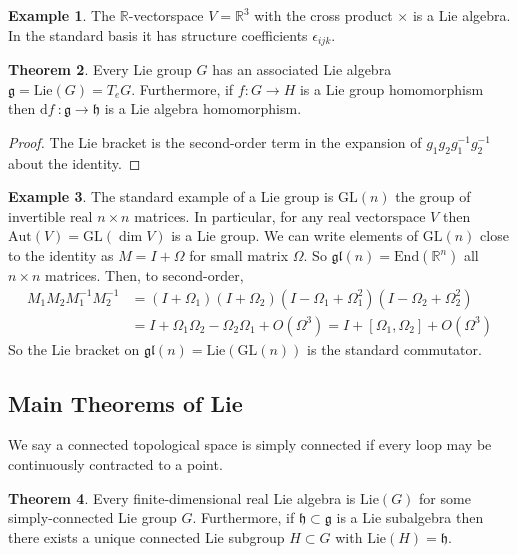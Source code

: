 \documentclass[12pt]{extarticle}
\newcommand{\R}{\mathbb{R}}
\newcommand{\End}[1]{\mathrm{End}\left(#1\right)}
\renewcommand{\d}[1]{ \mathrm{d}#1 \:}
\theoremstyle{definition}
\newtheorem{theorem}{Theorem}[section]
\newtheorem{example}[theorem]{Example}
\newenvironment{definition}[1][Definition:]{\begin{trivlist}
\item[\hskip \labelsep {\bfseries #1}]}{\end{trivlist}}
\newcommand{\GL}[1]{\mathrm{GL}\left(#1\right)}
\newcommand{\g}{\mathfrak{g}}
\newcommand{\h}{\mathfrak{h}}
\newcommand{\gl}[1]{\mathfrak{gl}\left(#1\right)}
\newcommand{\Lie}[1]{\mathrm{Lie}\left(#1 \right)}
\newcommand{\Aut}[1]{\mathrm{Aut}\left(#1 \right)}
\begin{document}
\begin{example}
The $\R$-vectorspace $V = \R^3$ with the cross product $\times$ is a Lie algebra. In the standard basis it has structure coefficients $\epsilon_{ijk}$. 
\end{example}


\begin{theorem}
Every Lie group $G$ has an associated Lie algebra $\g = \Lie{G} = T_e G$. Furthermore, if $f : G \to H$ is a Lie group homomorphism then $\d{f} : \g \to \h$ is a Lie algebra homomorphism.
\end{theorem}

\begin{proof}
The Lie bracket is the second-order term in the expansion of $g_1 g_2 g_1^{-1} g_2^{-1}$ about the identity.
\end{proof}

\begin{example}
The standard example of a Lie group is $\GL{n}$ the group of invertible real $n \times n$ matrices. In particular, for any real vectorspace $V$ then $\Aut{V} = \GL{\dim{V}}$ is a Lie group. We can write elements of $\GL{n}$ close to the identity as $M = I + \Omega$ for small matrix $\Omega$. So $\gl{n} = \End{\R^n}$ all $n \times n$ matrices. Then, to second-order,
\begin{align*}
M_1 M_2 M_1^{-1} M_2^{-1} & = (I + \Omega_1)(I + \Omega_2)(I - \Omega_1 + \Omega_1^2)(I - \Omega_2 + \Omega_2^2)
\\
& = I + \Omega_1 \Omega_2 - \Omega_2 \Omega_1 + O(\Omega^3) = I + [\Omega_1, \Omega_2] + O(\Omega^3)
\end{align*}
So the Lie bracket on $\gl{n} = \Lie{\GL{n}}$ is the standard commutator. 
\end{example}

\subsection{Main Theorems of Lie}

\begin{definition}
We say a connected topological space is simply connected if every loop may be continuously contracted to a point. 
\end{definition}

\begin{theorem}
Every finite-dimensional real Lie algebra is $\Lie{G}$ for some simply-connected Lie group $G$. Furthermore, if $\h \subset \g$ is a Lie subalgebra then there exists a unique connected Lie subgroup $H \subset G$ with $\Lie{H} = \h$.
\end{theorem}
\end{document}

